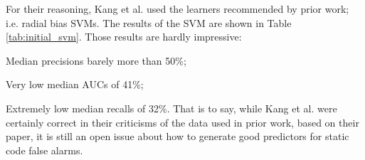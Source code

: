 For their reasoning, 
Kang et al. used  the learners recommended by prior work;
i.e. radial bias  SVMs.
The results of the SVM are shown in Table \ref{tab:initial_svm}.
Those results are hardly impressive:
\bi
\item Median precisions barely more than 50\%;
\item Very low median AUCs of 41\%;
\item Extremely low median recalls of 32\%.
\ei
That is to say, while Kang et al. were certainly correct
in their criticisms of the data used in prior work, based on their paper,
it is still an open issue about how to   generate good predictors for static code false alarms. 







 
 